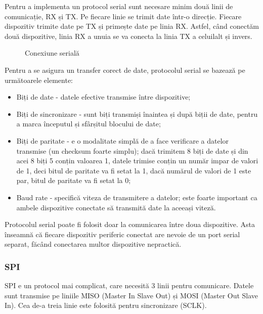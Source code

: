 Pentru a implementa un protocol serial sunt necesare minim două linii de
comunicație, RX și TX. Pe fiecare linie se trimit date într-o direcție. Fiecare
dispozitiv trimite date pe TX și primește date pe linia RX. Astfel, când
conectăm două dispozitive, linia RX a unuia se va conecta la linia TX a
celuilalt și invers.

\begin{figure}[htbp]
	\centering
	\def\svgwidth{\columnwidth}
	
	\caption{Conexiune serială}
	\label{fig:embed-serial}
\end{figure}

Pentru a se asigura un transfer corect de date, protocolul serial se bazează pe
următoarele elemente:

\begin{itemize}
	\item Biți de date - datele efective transmise între dispozitive;
	\item Biți de sincronizare - sunt biți transmiși înaintea și după biții
		de date, pentru a marca începutul și sfârșitul blocului de date;
	\item Biți de paritate - e o modalitate simplă de a face verificare a
		datelor transmise (un checksum foarte simplu); dacă trimitem 8
		biți de date și din acei 8 biți 5 conțin valoarea 1, datele
		trimise conțin un număr impar de valori de 1, deci bitul de
		paritate va fi setat la 1, dacă numărul de valori de 1 este par,
		bitul de paritate va fi setat la 0;
	\item Baud rate - specifică viteza de transmitere a datelor; este foarte
		important ca ambele dispozitive conectate să transmită date la
		aceeași viteză.
\end{itemize}

Protocolul serial poate fi folosit doar la comunicarea între doua dispozitive.
Asta înseamnă că fiecare dispozitiv periferic conectat are nevoie de un port
serial separat, făcând conectarea multor dispozitive nepractică.

\subsubsection{SPI}
\label{sec:embed-bus-wire-serial}

SPI e un protocol mai complicat, care necesită 3 linii pentru comunicare. Datele
sunt transmise pe liniile MISO (Master In Slave Out) și MOSI (Master Out Slave
In). Cea de-a treia linie este folosită pentru sincronizare (SCLK).

